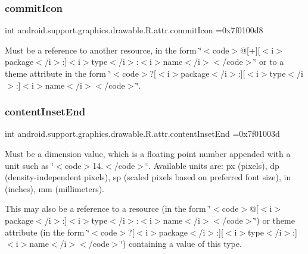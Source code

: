 \subsubsection{\texorpdfstring{commit\+Icon}{commitIcon}}
{\footnotesize\ttfamily int android.\+support.\+graphics.\+drawable.\+R.\+attr.\+commit\+Icon =0x7f0100d8\hspace{0.3cm}{\ttfamily [static]}}

Must be a reference to another resource, in the form \char`\"{}$<$code$>$@\mbox{[}+\mbox{]}\mbox{[}$<$i$>$package$<$/i$>$\+:\mbox{]}$<$i$>$type$<$/i$>$\+:$<$i$>$name$<$/i$>$$<$/code$>$\char`\"{} or to a theme attribute in the form \char`\"{}$<$code$>$?\mbox{[}$<$i$>$package$<$/i$>$\+:\mbox{]}\mbox{[}$<$i$>$type$<$/i$>$\+:\mbox{]}$<$i$>$name$<$/i$>$$<$/code$>$\char`\"{}. \mbox{\label{classandroid_1_1support_1_1graphics_1_1drawable_1_1R_1_1attr_a598f9ee46c4d9182528f2ce45bbc6b5a}} 
\subsubsection{\texorpdfstring{content\+Inset\+End}{contentInsetEnd}}
{\footnotesize\ttfamily int android.\+support.\+graphics.\+drawable.\+R.\+attr.\+content\+Inset\+End =0x7f01003d\hspace{0.3cm}{\ttfamily [static]}}

Must be a dimension value, which is a floating point number appended with a unit such as \char`\"{}$<$code$>$14.\+5sp$<$/code$>$\char`\"{}. Available units are\+: px (pixels), dp (density-\/independent pixels), sp (scaled pixels based on preferred font size), in (inches), mm (millimeters). 

This may also be a reference to a resource (in the form \char`\"{}$<$code$>$@\mbox{[}$<$i$>$package$<$/i$>$\+:\mbox{]}$<$i$>$type$<$/i$>$\+:$<$i$>$name$<$/i$>$$<$/code$>$\char`\"{}) or theme attribute (in the form \char`\"{}$<$code$>$?\mbox{[}$<$i$>$package$<$/i$>$\+:\mbox{]}\mbox{[}$<$i$>$type$<$/i$>$\+:\mbox{]}$<$i$>$name$<$/i$>$$<$/code$>$\char`\"{}) containing a value of this type. \mbox{\label{classandroid_1_1support_1_1graphics_1_1drawable_1_1R_1_1attr_ab973b752450f14f784c54d2ade692447}} 
